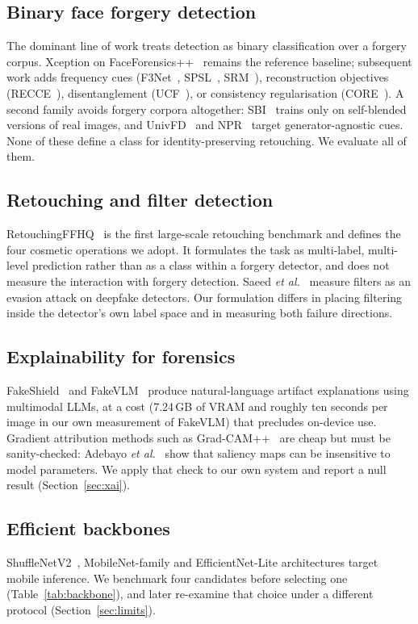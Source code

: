 \documentclass[conference]{IEEEtran}
\begin{document}
\subsection{Binary face forgery detection}
The dominant line of work treats detection as binary classification over a forgery corpus.
Xception on FaceForensics++~\cite{rossler2019} remains the reference baseline; subsequent
work adds frequency cues (F3Net~\cite{qian2020}, SPSL~\cite{liu2021}, SRM~\cite{luo2021}),
reconstruction objectives (RECCE~\cite{cao2022}), disentanglement (UCF~\cite{yan2023ucf}),
or consistency regularisation (CORE~\cite{ni2022}). A second family avoids forgery corpora
altogether: SBI~\cite{shiohara2022} trains only on self-blended versions of real images,
and UnivFD~\cite{ojha2023} and NPR~\cite{tan2024} target generator-agnostic cues. None of
these define a class for identity-preserving retouching. We evaluate all of them.

\subsection{Retouching and filter detection}
RetouchingFFHQ~\cite{ying2023} is the first large-scale retouching benchmark and defines the
four cosmetic operations we adopt. It formulates the task as multi-label, multi-level
prediction rather than as a class within a forgery detector, and does not measure the
interaction with forgery detection. Saeed \emph{et al.}~\cite{saeed2025} measure filters as
an evasion attack on deepfake detectors. Our formulation differs in placing filtering
inside the detector's own label space and in measuring both failure directions.

\subsection{Explainability for forensics}
FakeShield~\cite{xu2025} and FakeVLM~\cite{wen2025} produce natural-language artifact
explanations using multimodal LLMs, at a cost (7.24\,GB of VRAM and roughly ten seconds per
image in our own measurement of FakeVLM) that precludes on-device use. Gradient attribution
methods such as Grad-CAM++~\cite{chattopadhyay2018} are cheap but must be sanity-checked:
Adebayo \emph{et al.}~\cite{adebayo2018} show that saliency maps can be insensitive to model
parameters. We apply that check to our own system and report a null result
(Section~\ref{sec:xai}).

\subsection{Efficient backbones}
ShuffleNetV2~\cite{ma2018}, MobileNet-family and EfficientNet-Lite architectures target
mobile inference. We benchmark four candidates before selecting one (Table~\ref{tab:backbone}),
and later re-examine that choice under a different protocol (Section~\ref{sec:limits}).
\end{document}
